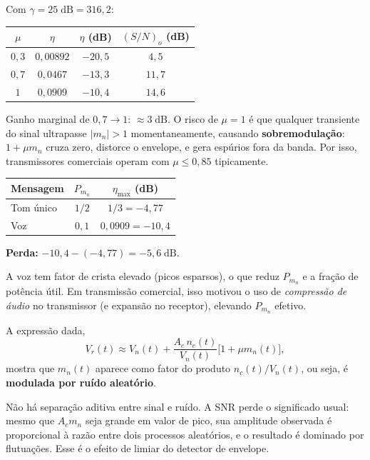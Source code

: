 \documentclass[11pt,a4paper]{article}
\begin{document}
\begin{resolucao}

Com $\gamma = 25\;\text{dB} = 316{,}2$:

\begin{center}
\begin{tabular}{cccc}
\toprule
$\mu$ & $\eta$ & $\eta$ (dB) & $(S/N)_o$ (dB) \\
\midrule
$0{,}3$ & $0{,}00892$ & $-20{,}5$ & $4{,}5$ \\
$0{,}7$ & $0{,}0467$ & $-13{,}3$ & $11{,}7$ \\
$1$ & $0{,}0909$ & $-10{,}4$ & $14{,}6$ \\
\bottomrule
\end{tabular}
\end{center}

Ganho marginal de $0{,}7 \to 1$: $\approx 3\;\text{dB}$. O risco de $\mu = 1$ é que qualquer transiente do sinal ultrapasse $|m_n| > 1$ momentaneamente, causando \textbf{sobremodulação}: $1 + \mu m_n$ cruza zero, distorce o envelope, e gera espúrios fora da banda. Por isso, transmissores comerciais operam com $\mu \le 0{,}85$ tipicamente.
\end{resolucao}

\begin{resolucao}

\begin{center}
\begin{tabular}{lcc}
\toprule
Mensagem & $P_{m_n}$ & $\eta_{\max}$ (dB) \\
\midrule
Tom único & $1/2$ & $1/3 = -4{,}77$ \\
Voz & $0{,}1$ & $0{,}0909 = -10{,}4$ \\
\bottomrule
\end{tabular}
\end{center}

\textbf{Perda:} $-10{,}4 - (-4{,}77) = -5{,}6\;\text{dB}$.

A voz tem fator de crista elevado (picos esparsos), o que reduz $P_{m_n}$ e a fração de potência útil. Em transmissão comercial, isso motivou o uso de \emph{compressão de áudio} no transmissor (e expansão no receptor), elevando $P_{m_n}$ efetivo.
\end{resolucao}

\begin{resolucao}

A expressão dada,
\[
  V_r(t) \approx V_n(t) + \frac{A_c\, n_c(t)}{V_n(t)}\big[1 + \mu m_n(t)\big],
\]
mostra que $m_n(t)$ aparece como fator do produto $n_c(t)/V_n(t)$, ou seja, é \textbf{modulada por ruído aleatório}.

Não há separação aditiva entre sinal e ruído. A SNR perde o significado usual: mesmo que $A_c m_n$ seja grande em valor de pico, sua amplitude observada é proporcional à razão entre dois processos aleatórios, e o resultado é dominado por flutuações. Esse é o efeito de limiar do detector de envelope.
\end{resolucao}
\end{document}
